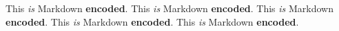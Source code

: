 
\def\mytitle{Markdown in HTML Test}
\def\latexmode{memoir}


This \emph{is} Markdown \textbf{encoded}.
This \emph{is} Markdown \textbf{encoded}.
This \emph{is} Markdown \textbf{encoded}.
This \emph{is} Markdown \textbf{encoded}.
This \emph{is} Markdown \textbf{encoded}.




